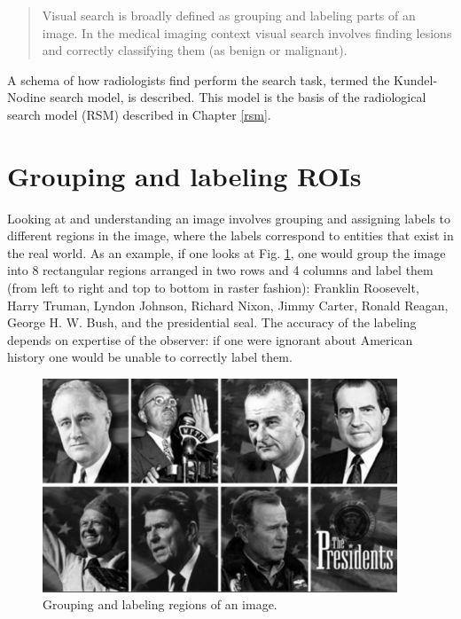 \documentclass[
]{book}
\begin{document}
\begin{quote}
Visual search is broadly defined as grouping and labeling parts of an image. In the medical imaging context visual search involves finding lesions and correctly classifying them (as benign or malignant).
\end{quote}

A schema of how radiologists find perform the search task, termed the Kundel-Nodine search model, is described. This model is the basis of the radiological search model (RSM) described in Chapter \ref{rsm}.

\hypertarget{visual-search-grouping-labeling-rois}{%
\section{Grouping and labeling ROIs}\label{visual-search-grouping-labeling-rois}}

Looking at and understanding an image involves grouping and assigning labels to different regions in the image, where the labels correspond to entities that exist in the real world. As an example, if one looks at Fig. \ref{fig:visual-search-us-presidents}, one would group the image into 8 rectangular regions arranged in two rows and 4 columns and label them (from left to right and top to bottom in raster fashion): Franklin Roosevelt, Harry Truman, Lyndon Johnson, Richard Nixon, Jimmy Carter, Ronald Reagan, George H. W. Bush, and the presidential seal. The accuracy of the labeling depends on expertise of the observer: if one were ignorant about American history one would be unable to correctly label them.

\begin{figure}

{\centering \includegraphics[width=300pt]{images/15-visual-search/usPresidents} 

}

\caption{Grouping and labeling regions of an image.}\label{fig:visual-search-us-presidents}
\end{figure}
\end{document}
